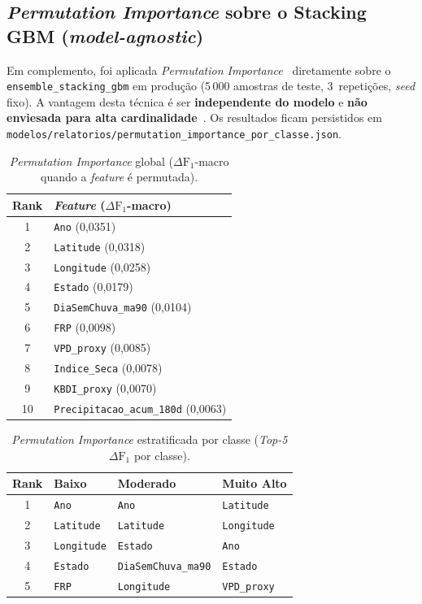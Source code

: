 \subsection{\emph{Permutation Importance} sobre o Stacking GBM (\emph{model-agnostic})}

Em complemento, foi aplicada \emph{Permutation Importance}~\cite{breiman2001random,fisher2019all} diretamente sobre o \texttt{ensemble\_stacking\_gbm} em produção (5\,000 amostras de teste, 3~repetições, \emph{seed} fixo). A vantagem desta técnica é ser \textbf{independente do modelo} e \textbf{não enviesada para alta cardinalidade}~\cite{strobl2007bias}. Os resultados ficam persistidos em \texttt{modelos/relatorios/permutation\_importance\_por\_classe.json}.

\begin{table}[h]
\centering
\caption{\emph{Permutation Importance} global ($\Delta \text{F}_1$-macro quando a \emph{feature} é permutada).}
\label{tab:res_perm_global}
\begin{tabular}{cl}
\toprule
\textbf{Rank} & \textbf{\emph{Feature} ($\Delta \text{F}_1$-macro)} \\
\midrule
1 & \texttt{Ano} (0,0351) \\
2 & \texttt{Latitude} (0,0318) \\
3 & \texttt{Longitude} (0,0258) \\
4 & \texttt{Estado} (0,0179) \\
5 & \texttt{DiaSemChuva\_ma90} (0,0104) \\
6 & \texttt{FRP} (0,0098) \\
7 & \texttt{VPD\_proxy} (0,0085) \\
8 & \texttt{Indice\_Seca} (0,0078) \\
9 & \texttt{KBDI\_proxy} (0,0070) \\
10 & \texttt{Precipitacao\_acum\_180d} (0,0063) \\
\bottomrule
\end{tabular}
\end{table}

\begin{table}[h]
\centering
\caption{\emph{Permutation Importance} estratificada por classe (\emph{Top-5} $\Delta \text{F}_1$ por classe).}
\label{tab:res_perm_por_classe}
\footnotesize
\begin{tabular}{clll}
\toprule
\textbf{Rank} & \textbf{Baixo} & \textbf{Moderado} & \textbf{Muito Alto} \\
\midrule
1 & \texttt{Ano} & \texttt{Ano} & \texttt{Latitude} \\
2 & \texttt{Latitude} & \texttt{Latitude} & \texttt{Longitude} \\
3 & \texttt{Longitude} & \texttt{Estado} & \texttt{Ano} \\
4 & \texttt{Estado} & \texttt{DiaSemChuva\_ma90} & \texttt{Estado} \\
5 & \texttt{FRP} & \texttt{Longitude} & \texttt{VPD\_proxy} \\
\bottomrule
\end{tabular}
\end{table}

